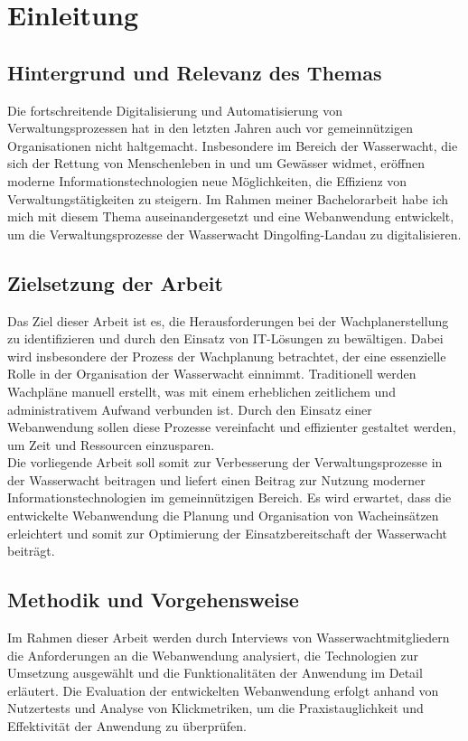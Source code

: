 \documentclass[fontsize=12pt,openright,oneside,paper=a4,BCOR=1cm]{scrbook}
\begin{document}



\tableofcontents

\listoffigures

%
%

\chapter{Einleitung}
\section{Hintergrund und Relevanz des Themas}
Die fortschreitende Digitalisierung und Automatisierung von Verwaltungsprozessen hat in den letzten Jahren auch vor gemeinnützigen Organisationen nicht haltgemacht. Insbesondere im Bereich der Wasserwacht, die sich der Rettung von Menschenleben in und um Gewässer widmet, eröffnen moderne Informationstechnologien neue Möglichkeiten, die Effizienz von Verwaltungstätigkeiten zu steigern. Im Rahmen meiner Bachelorarbeit habe ich mich mit diesem Thema auseinandergesetzt und eine Webanwendung entwickelt, um die Verwaltungsprozesse der Wasserwacht Dingolfing-Landau zu digitalisieren. 
\section{Zielsetzung der Arbeit}
Das Ziel dieser Arbeit ist es, die Herausforderungen bei der Wachplanerstellung zu identifizieren und durch den Einsatz von IT-Lösungen zu bewältigen. Dabei wird insbesondere der Prozess der Wachplanung betrachtet, der eine essenzielle Rolle in der Organisation der Wasserwacht einnimmt. Traditionell werden Wachpläne manuell erstellt, was mit einem erheblichen zeitlichem und administrativem Aufwand verbunden ist. Durch den Einsatz einer Webanwendung sollen diese Prozesse vereinfacht und effizienter gestaltet werden, um Zeit und Ressourcen einzusparen. \\
Die vorliegende Arbeit soll somit zur Verbesserung der Verwaltungsprozesse in der Wasserwacht beitragen und liefert einen Beitrag zur Nutzung moderner Informationstechnologien im gemeinnützigen Bereich. Es wird erwartet, dass die entwickelte Webanwendung die Planung und Organisation von Wacheinsätzen erleichtert und somit zur Optimierung der Einsatzbereitschaft der Wasserwacht beiträgt. 
\section{Methodik und Vorgehensweise}
Im Rahmen dieser Arbeit werden durch Interviews von Wasserwachtmitgliedern die Anforderungen an die Webanwendung analysiert, die Technologien zur Umsetzung ausgewählt und die Funktionalitäten der Anwendung im Detail erläutert. Die Evaluation der entwickelten Webanwendung erfolgt anhand von Nutzertests und Analyse von Klickmetriken, um die Praxistauglichkeit und Effektivität der Anwendung zu überprüfen. 
\end{document}
